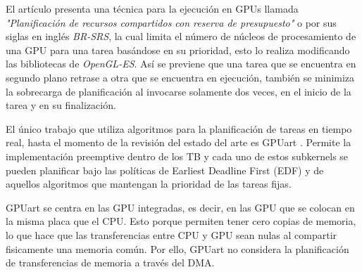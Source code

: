 \begin{enumerate}
	
	El artículo \cite{Pridriven} presenta una técnica para la ejecución en GPUs llamada \textit{"Planificación de recursos compartidos con reserva de presupuesto"} o por sus siglas en inglés \textit{BR-SRS}, la cual limita el número de núcleos de procesamiento de una GPU para una tarea basándose en su prioridad, esto lo realiza modificando las bibliotecas de  \textit{OpenGL-ES}. Así se previene que una tarea que se encuentra en segundo plano retrase a otra que se encuentra en ejecución, también se minimiza la sobrecarga de planificación al invocarse solamente dos veces, en el inicio de la tarea y en su finalización.


El único trabajo que utiliza algoritmos para la planificación de tareas en tiempo real, hasta el momento de la revisión del estado del arte es GPUart \cite{GPUArt}. Permite la implementación preemptive dentro de los TB y cada uno de estos subkernels se pueden planificar bajo las políticas de Earliest Deadline First (EDF) y de aquellos algoritmos que mantengan la prioridad de las tareas fijas.

\vspace{0.3cm}

GPUart se centra en las GPU integradas, es decir, en las GPU que se colocan en la misma placa que el CPU. Esto porque permiten tener cero copias de memoria, lo que hace que las transferencias entre CPU y GPU sean nulas al compartir fisicamente una memoria común. Por ello, GPUart no considera la planificación de transferencias de memoria a través del DMA.
 
 	
\end{enumerate}
 
